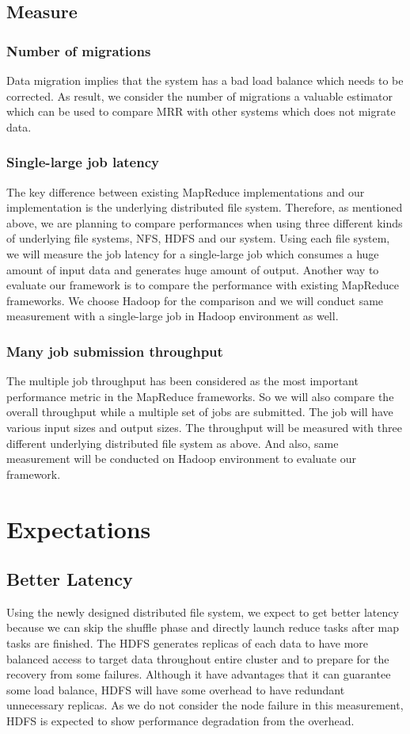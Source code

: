 \documentclass[11pt,a4paper]{article}
\begin{document}
\begin{multicols}{2}
\subsection*{Measure}
\subsubsection*{Number of migrations}
Data migration implies that the system has a bad load balance which needs to be corrected. As
result, we consider the number of migrations a valuable estimator which can be used to compare
MRR with other systems which does not migrate data. 

\subsubsection*{Single-large job latency}
The key difference between existing MapReduce implementations and our implementation is the
underlying distributed file system.
Therefore, as mentioned above, we are planning to compare performances when using three different
kinds of underlying file systems, NFS, HDFS and our system.
Using each file system, we will measure the job latency for a single-large job which consumes
a huge amount of input data and generates huge amount of output.
Another way to evaluate our framework is to compare the performance with existing MapReduce
frameworks. We choose Hadoop for the comparison and we will conduct same measurement with a
single-large job in Hadoop environment as well.

\subsubsection*{Many job submission throughput}
The multiple job throughput has been considered as the most important performance metric in
the MapReduce frameworks.
So we will also compare the overall throughput while a multiple set of jobs are submitted. The
job will have various input sizes and output sizes.
The throughput will be measured with three different underlying distributed file system as above.
And also, same measurement will be conducted on Hadoop environment to evaluate our framework.


\section*{Expectations}
\subsection*{Better Latency}
Using the newly designed distributed file system, we expect to get better latency because we
can skip the shuffle phase and directly launch reduce tasks after map tasks are finished. The
HDFS generates replicas of each data to have more balanced access to target data throughout
entire cluster and to prepare for the recovery from some failures. Although it have advantages
that it can guarantee some load balance, HDFS will have some overhead to have redundant unnecessary
replicas. As we do not consider the node failure in this measurement, HDFS is expected to show
performance degradation from the overhead.


\end{multicols}
\end{document}
